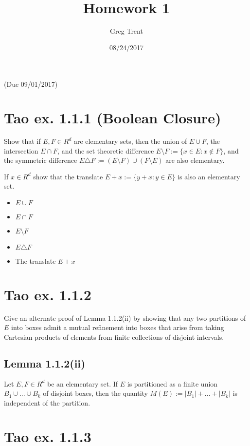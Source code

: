 \documentclass{article}
\author{Greg Trent}
\title{Homework 1}
\date{08/24/2017}
\begin{document}
\maketitle
(Due 09/01/2017)
\section{Tao ex. 1.1.1 (Boolean Closure)}
Show that if $E, F \in R^d$ are elementary sets, then the union of $E \cup F$, the intersection $E \cap F$, and the set theoretic difference $E \setminus F := \{ x \in E : x \notin F\}$, and the symmetric difference $E \triangle F := (E \setminus F) \cup (F \setminus E)$ are also elementary. 

If $x \in R^d$ show that the translate $E+x := \{y+x : y \in E\}$ is also an elementary set.

\begin{itemize}
\item $E \cup F$



\item $E \cap F$ 


\item $E \setminus F$


\item $E \triangle F$



\item The translate $E+x$

\end{itemize}

\section{Tao ex. 1.1.2}
Give an alternate proof of Lemma 1.1.2(ii) by showing that any two partitions of $E$ into boxes admit a mutual refinement into boxes that arise from taking Cartesian products of elements from finite collections of disjoint intervals. 

\subsection{Lemma 1.1.2(ii)}
Let $E, F \in R^d$ be an elementary set. If $E$ is partitioned as a finite union $B_1 \cup ... \cup B_k$ of disjoint boxes, then the quantity $M(E) := |B_1| + ... + |B_k|$ is independent of the partition. 


\section{Tao ex. 1.1.3}
\end{document}
